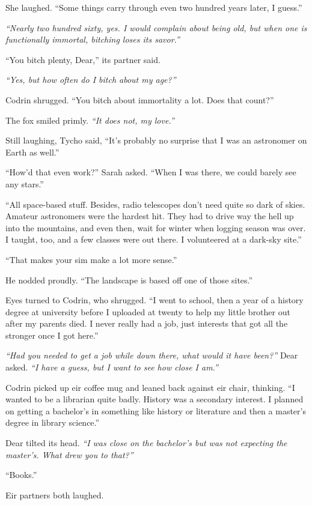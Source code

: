 She laughed. ``Some things carry through even two hundred years later, I guess.''

\emph{``Nearly two hundred sixty, yes. I would complain about being old, but when one is functionally immortal, bitching loses its savor.''}

``You bitch plenty, Dear,'' its partner said.

\emph{``Yes, but how often do I bitch about my age?''}

Codrin shrugged. ``You bitch about immortality a lot. Does that count?''

The fox smiled primly. \emph{``It does not, my love.''}

Still laughing, Tycho said, ``It's probably no surprise that I was an astronomer on Earth as well.''

``How'd that even work?'' Sarah asked. ``When I was there, we could barely see any stars.''

``All space-based stuff. Besides, radio telescopes don't need quite so dark of skies. Amateur astronomers were the hardest hit. They had to drive way the hell up into the mountains, and even then, wait for winter when logging season was over. I taught, too, and a few classes were out there. I volunteered at a dark-sky site.''

``That makes your sim make a lot more sense.''

He nodded proudly. ``The landscape is based off one of those sites.''

Eyes turned to Codrin, who shrugged. ``I went to school, then a year of a history degree at university before I uploaded at twenty to help my little brother out after my parents died. I never really had a job, just interests that got all the stronger once I got here.''

\emph{``Had you needed to get a job while down there, what would it have been?''} Dear asked. \emph{``I have a guess, but I want to see how close I am.''}

Codrin picked up eir coffee mug and leaned back against eir chair, thinking. ``I wanted to be a librarian quite badly. History was a secondary interest. I planned on getting a bachelor's in something like history or literature and then a master's degree in library science.''

Dear tilted its head. \emph{``I was close on the bachelor's but was not expecting the master's. What drew you to that?''}

``Books.''

Eir partners both laughed.

